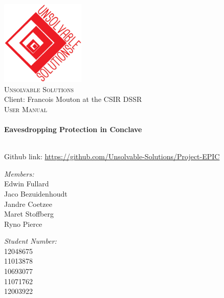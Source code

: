 
\begin{titlepage}
\begin{center}
\includegraphics[width = 0.3\textwidth]{US_logo.png}~\\[1cm]
\textsc{\LARGE Unsolvable Solutions}\\
Client: Francois Mouton at the CSIR DSSR\\[1.5cm]
\textsc{\Large  User Manual}\\[0.5cm]

 \HRule\\[0.4cm]
{ \huge \bfseries  Eavesdropping Protection in Conclave \\[0.4cm] }

 \HRule\\ 



Github link:  \url{https://github.com/Unsolvable-Solutions/Project-EPIC} \\[1.2cm]

\noindent
\begin{minipage}[t]{0.4\textwidth}

	\begin{flushleft} \large
	\emph{Members:}\\
		Edwin Fullard  \\
		Jaco Bezuidenhoudt \\
		Jandre Coetzee\\
		Maret Stoffberg\\
		Ryno Pierce\\
	\end{flushleft}
\end{minipage}%
\begin{minipage}[t]{0.4\textwidth}
\begin{flushright} \large
	\emph{Student Number:} \\
		12048675 \\
		11013878 \\
		 10693077 \\
		 11071762 \\
		 12003922\\
	\end{flushright}
\end{minipage}

\vfill






\end{center}
\end{titlepage}
